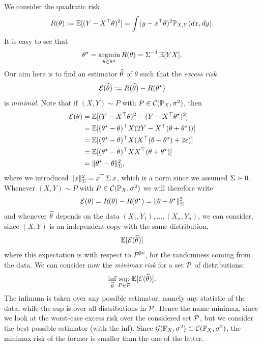 We consider the quadratic risk
\begin{equation*}
	R(\theta) := \mathbb E [ (Y - X^\top \theta)^2] = \int (y - x^\top \theta)^2 \mathbb P_{X, Y}(dx, dy).
\end{equation*}
It is easy to see that
\begin{equation*}
	\theta^\star = \operatorname*{argmin}_{\theta \in \mathbb R^d} R(\theta) = \operatorname{\boldsymbol \Sigma}^{-1} \mathbb E[Y X].
\end{equation*}
Our aim here is to find an estimator%
$\widehat \theta$ of $\theta$  such that the \emph{excess risk}
\begin{equation*}
	\operatorname{{\mathcal E}}(\widehat \theta) := R(\widehat \theta) - R(\theta^\star)
\end{equation*}
is \emph{minimal}.
Note that if $(X, Y) \sim P$ with $P \in \operatorname{{\mathcal C}}(\mathbb P_X, \sigma^2)$, then
\begin{align*}
	\operatorname{{\mathcal E}}(\theta) &= \mathbb E [ (Y - X^\top \theta)^2 - (Y - X^\top \theta^\star)^2] \\
	&= \mathbb E [ (\theta^\star - \theta)^\top X (2 Y - X^\top (\theta + \theta^\star))] \\
	&= \mathbb E [ (\theta^\star - \theta)^\top X (X^\top (\theta + \theta^\star) + 2 \varepsilon)] \\
	&= \mathbb E [ (\theta^\star - \theta)^\top X X^\top (\theta + \theta^\star)] \\
	&= \| \theta^\star - \theta \|_{\operatorname{\boldsymbol \Sigma}}^2,
\end{align*}%
%
where we introduced $\| x \|_{\operatorname{\boldsymbol \Sigma}}^2 = x^\top \operatorname{\boldsymbol \Sigma} x$, which is a norm since we assumed $\operatorname{\boldsymbol \Sigma} \succ 0$.
Whenever $(X, Y) \sim P$ with $P \in \operatorname{{\mathcal C}}(\mathbb P_X, \sigma^2)$ we will therefore write
\begin{equation*}
	\operatorname{{\mathcal E}}(\theta) = R(\theta) - R(\theta^\star) = \| \theta - \theta^\star \|_{\operatorname{\boldsymbol \Sigma}}^2
\end{equation*}
and whenever $\widehat \theta$ depends on the data $(X_1, Y_1), \ldots, (X_n, Y_n)$, we can consider, since $(X, Y)$ is an independent copy with the same distribution,
\begin{equation*}
	\mathbb E [ \operatorname{{\mathcal E}}(\widehat \theta) ]
\end{equation*}
where this expectation is with respect to $P^{\otimes n}$, for the randomness coming from the data. 
We can consider now the \emph{minimax risk} for a set $\operatorname{{\mathcal P}}$ of distributions:
\begin{equation*}
	\inf_{\widehat \theta} \sup_{P \in \operatorname{{\mathcal P}}} \mathbb E[\operatorname{{\mathcal E}}(\widehat \theta)].
\end{equation*}
The infimum is taken over any possible estimator, namely any statistic of the data, while the sup is over all distributions in $\operatorname{{\mathcal P}}$. Hence the name minimax, since we look at the worst-case excess risk over the considered set $\operatorname{{\mathcal P}}$, but we consider the best possible estimator (with the inf).
Since $\operatorname{{\mathcal G}}(\mathbb P_X, \sigma^2) \subset \operatorname{{\mathcal C}}(\mathbb P_X, \sigma^2)$, the minimax risk of the former is smaller than the one of the latter.

